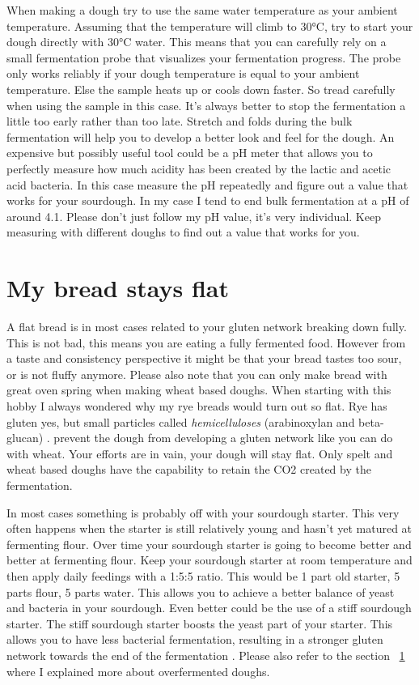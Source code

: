 When making a dough try to use the same water temperature
as your ambient temperature. Assuming that the temperature
will climb to 30°C, try to start your dough directly
with 30°C water. This means that you can carefully rely on
a small fermentation probe that visualizes your fermentation
progress. The probe only works reliably if your dough temperature
is equal to your ambient temperature. Else the sample heats
up or cools down faster. So tread carefully when using
the sample in this case. It's always better to stop
the fermentation a little too early rather than too late.
Stretch and folds during the bulk fermentation
will help you to develop a better look and feel for
the dough. An expensive but possibly useful tool
could be a pH meter that allows you to perfectly
measure how much acidity has been created by the
lactic and acetic acid bacteria. In this case measure
the pH repeatedly and figure out a value that works
for your sourdough. In my case I tend to end bulk
fermentation at a pH of around 4.1. Please don't just
follow my pH value, it's very individual. Keep measuring
with different doughs to find out a value that works for you.

\section{My bread stays flat}
\label{sec:flat-bread-crumb}

A flat bread is in most cases related to your gluten
network breaking down fully. This is not bad, this
means you are eating a fully fermented food. However
from a taste and consistency perspective it might be
that your bread tastes too sour, or is not fluffy anymore.
Please also note that you can only make bread with
great oven spring when making wheat based doughs. When
starting with this hobby I always wondered why my rye
breads would turn out so flat. Rye has gluten yes, but
small particles called {\it hemicelluloses} (arabinoxylan and beta-glucan) \cite{rye-defects}.
prevent the dough from developing a gluten network like you can
do with wheat. Your efforts are in vain, your dough will
stay flat. Only spelt and wheat based doughs have the capability
to retain the CO2 created by the fermentation.

In most cases something is probably off with your
sourdough starter. This very often happens when the starter
is still relatively young and hasn't yet matured
at fermenting flour. Over time your sourdough
starter is going to become better and better at fermenting
flour. Keep your sourdough starter at room temperature
and then apply daily feedings with a 1:5:5 ratio.
This would be 1 part old starter, 5 parts flour,
5 parts water. This allows you to achieve a better
balance of yeast and bacteria in your sourdough.
Even better could be the use of a stiff sourdough
starter. The stiff sourdough starter boosts
the yeast part of your starter. This allows you
to have less bacterial fermentation, resulting
in a stronger gluten network towards the end
of the fermentation \cite{stiff+starter}. Please
also refer to the section ~\ref{sec:flat-bread-crumb} where
I explained more about overfermented doughs.


